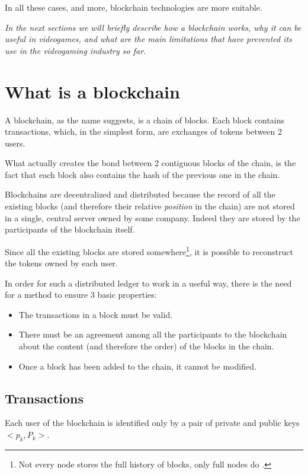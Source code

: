 \documentclass[12pt]{article}
\begin{document}
In all these cases, and more, blockchain technologies are more suitable.

\emph{In the next sections we will briefly describe how a blockchain works, why it can be useful in videogames, and what are the main limitations that have prevented its use in the videogaming industry so far.}

\section {What is a blockchain} \label{section:wiab}
A blockchain, as the name suggests, is a chain of blocks. Each block contains transactions, which, in the simplest form, are exchanges of tokens between 2 users.

What actually creates the bond between 2 contiguous blocks of the chain, is the fact that each block also contains the hash of the previous one in the chain.

Blockchains are decentralized and distributed because the record of all the existing blocks (and therefore their relative \textit{position} in the chain) are not stored in a single, central server owned by some company. 
Indeed they are stored by the participants of the blockchain itself.

Since all the existing blocks are stored somewhere\footnote{Not every node stores the full history of blocks, only full nodes do \cite{bitcoin_full_nodes}.}, it is possible to reconstruct the tokens owned by each user.

In order for such a distributed ledger to work in a useful way, there is the need for a method to ensure 3 basic properties:
\begin{itemize}
    \item The transactions in a block must be valid.
    \item There must be an agreement among all the participants to the blockchain about the content (and therefore the order) of the blocks in the chain.
    \item Once a block has been added to the chain, it cannot be modified.
\end{itemize}

\subsection{Transactions} \label{subsection:transactions}
Each user of the blockchain is identified only by a pair of private and public keys \(<p_k, P_k>\).
\end{document}
